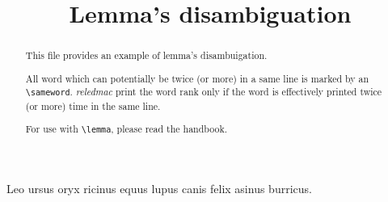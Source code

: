 \documentclass{article}
\begin{document}
\begin{english}
\date{}
\title{Lemma's disambiguation}
\maketitle


\begin{abstract}
This file provides an example of lemma's disambuigation.

All word which can potentially be twice (or more) in a same line is marked by an \verb+\sameword+. \emph{reledmac} print the word rank only if the word is effectively printed twice (or more) time in the same line.

For use with \verb+\lemma+, please read the handbook.

\end{abstract}
\end{english}





\beginnumbering
\pstart
Leo  ursus  oryx  ricinus  equus 
lupus  canis  felix  asinus  burricus.

\pend
\endnumbering
\end{document}
